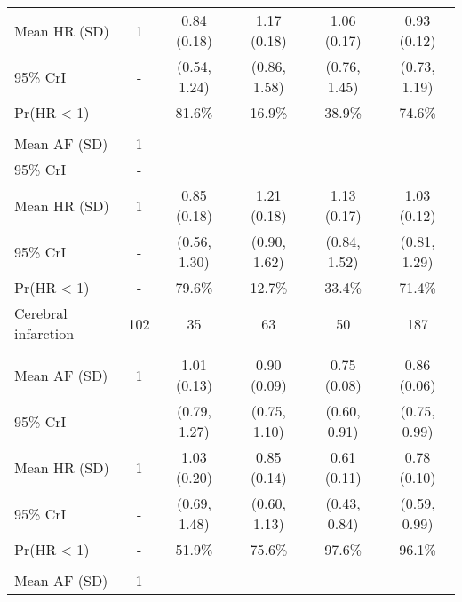 \documentclass[nutrients,article,submit,moreauthors,pdftex]{mdpi}
\begin{document}
\begin{table}[!h]
{\begin{tabular}[t]{lccccc}
\rowcolor{gray!6}  \hspace{1em}Mean HR (SD) & 1 & 0.84 (0.18) & 1.17 (0.18) & 1.06 (0.17) & 0.93 (0.12)\\
\hspace{1em}95\% CrI & - & (0.54, 1.24) & (0.86, 1.58) & (0.76, 1.45) & (0.73, 1.19)\\
\rowcolor{gray!6}  \hspace{1em}Pr(HR < 1) & - & 81.6\% & 16.9\% & 38.9\% & 74.6\%\\
\addlinespace[0.3em]
\multicolumn{6}{l}{\textbf{Model 2}}\\
\hspace{1em}Mean AF (SD) & 1 &  &  &  \vphantom{2} & \\
\rowcolor{gray!6}  \hspace{1em}95\% CrI & - &  &  &  \vphantom{2} & \\
\hspace{1em}Mean HR (SD) & 1 & 0.85 (0.18) & 1.21 (0.18) & 1.13 (0.17) & 1.03 (0.12)\\
\rowcolor{gray!6}  \hspace{1em}95\% CrI & - & (0.56, 1.30) & (0.90, 1.62) & (0.84, 1.52) & (0.81, 1.29)\\
\hspace{1em}Pr(HR < 1) & - & 79.6\% & 12.7\% & 33.4\% & 71.4\%\\
\hline
\rowcolor{gray!6}  Cerebral infarction & 102 & 35 & 63 & 50 & 187\\
\addlinespace[0.3em]
\multicolumn{6}{l}{\textbf{Model 0}}\\
\hspace{1em}Mean AF (SD) & 1 & 1.01 (0.13) & 0.90 (0.09) & 0.75 (0.08) & 0.86 (0.06)\\
\rowcolor{gray!6}  \hspace{1em}95\% CrI & - & (0.79, 1.27) & (0.75, 1.10) & (0.60, 0.91) & (0.75, 0.99)\\
\hspace{1em}Mean HR (SD) & 1 & 1.03 (0.20) & 0.85 (0.14) & 0.61 (0.11) & 0.78 (0.10)\\
\rowcolor{gray!6}  \hspace{1em}95\% CrI & - & (0.69, 1.48) & (0.60, 1.13) & (0.43, 0.84) & (0.59, 0.99)\\
\hspace{1em}Pr(HR < 1) & - & 51.9\% & 75.6\% & 97.6\% & 96.1\%\\
\addlinespace[0.3em]
\multicolumn{6}{l}{\textbf{Model 1}}\\
\rowcolor{gray!6}  \hspace{1em}Mean AF (SD) & 1 &  &  &  \vphantom{1} & \\

\end{tabular}}
\end{table}
\end{document}
